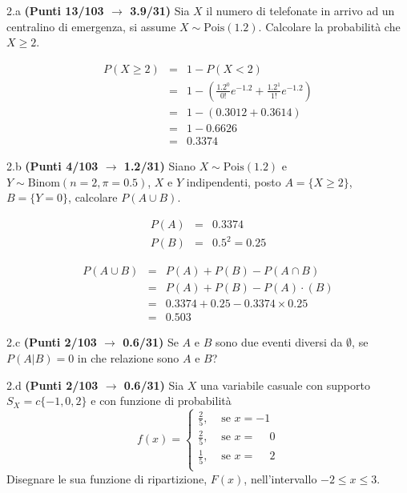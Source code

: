 \documentclass[
  11pt,
]{book}
\theoremstyle{mytheoremstyle}
\theoremstyle{mydefstyle}
\newenvironment{sol}
  {
  \begin{tcolorbox}[enhanced,breakable,arc=0.1mm,boxrule=1pt,colback=white,colframe=iblue,
  title=\bf \fontfamily{lmss}\selectfont \hspace{.5 cm} Soluzione,drop fuzzy shadow]

}{
\end{tcolorbox}
  }
\begin{document}
2.a \textbf{(Punti 13/103 \(\rightarrow\) 3.9/31)} Sia \(X\) il numero di telefonate in arrivo ad un centralino di emergenza, si assume \(X\sim\text{Pois}(1.2)\). Calcolare la probabilità che \(X\geq 2\).

\begin{sol}
\begin{eqnarray*}
   P( X \geq 2 ) &=& 1-P( X < 2 ) \\                 &=& 1-\left( \frac{ 1.2 ^{ 0 }}{ 0 !}e^{- 1.2 }+\frac{ 1.2 ^{ 1 }}{ 1 !}e^{- 1.2 } \right)\\                 &=& 1-( 0.3012+0.3614 )\\                 &=& 1- 0.6626 \\                 &=&   0.3374 
\end{eqnarray*}

\end{sol}

2.b \textbf{(Punti 4/103 \(\rightarrow\) 1.2/31)} Siano \(X\sim\text{Pois}(1.2)\) e \(Y\sim\text{Binom}(n=2,\pi=0.5)\), \(X\) e \(Y\) indipendenti, posto \(A=\{X\geq 2\}\), \(B=\{Y=0\}\), calcolare \(P(A\cup B)\).

\begin{sol}
\begin{eqnarray*}
  P(A) &=&  0.3374\\
  P(B) &=& 0.5^2 = 0.25
\end{eqnarray*}

\begin{eqnarray}
      P( A \cup B ) &=& P( A )+P( B )-P( A \cap B ) \\
                         &=& P( A )+P( B )-P( A )\cdot ( B ) \\
                         &=&  0.3374 + 0.25 - 0.3374 \times 0.25  \\
                         &=&  0.503 \end{eqnarray}

\end{sol}

2.c \textbf{(Punti 2/103 \(\rightarrow\) 0.6/31)} Se \(A\) e \(B\) sono due eventi diversi da \(\emptyset\), se
\(P(A|B)=0\) in che relazione sono \(A\) e \(B\)?

2.d \textbf{(Punti 2/103 \(\rightarrow\) 0.6/31)} Sia \(X\) una variabile casuale con supporto \(S_X=c\{-1,0,2\}\) e con funzione di probabilità
\[
f(x)=\begin{cases}
\frac 25, &\text{ se $x=-1$}\\
\frac 25, &\text{ se $x=\phantom{-} 0$}\\
\frac 15, &\text{ se $x=\phantom{-} 2$}\\
\end{cases}
\]
Disegnare le sua funzione di ripartizione, \(F(x)\), nell'intervallo \(-2\leq x\leq 3\).
\end{document}
